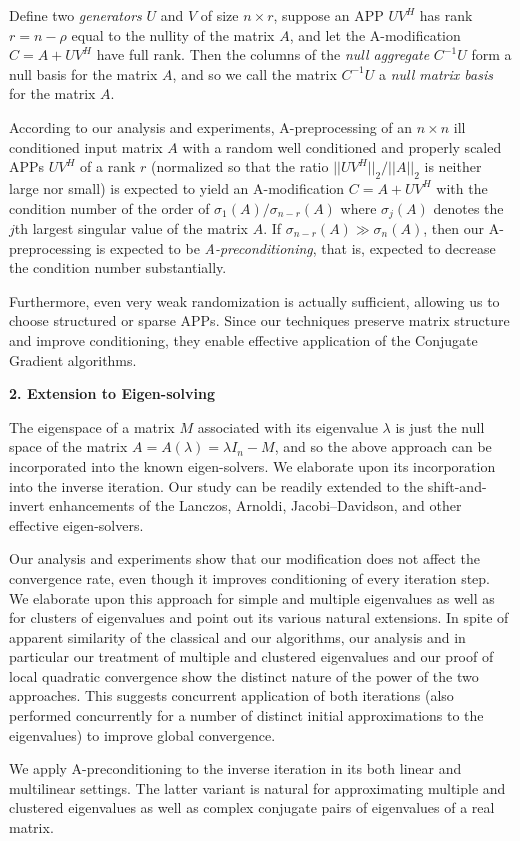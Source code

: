 \documentclass{report}
\begin{document}
Define two {\em generators} $U$ and $V$ of size $n \times r$, suppose an
APP $UV^H$ has rank $r=n-\rho$ equal to the nullity of the matrix $A$,
and let the A-modification $C=A+UV^H$ have full rank. Then the columns of
the {\em null aggregate} $C^{-1}U$ form a null basis for the matrix $A$,
and so we call the matrix $C^{-1}U$ a {\em null matrix basis} for the
matrix $A$.

According to our analysis and experiments, A-preprocessing of an $n\times
n$ ill conditioned input matrix $A$ with a random well conditioned and
properly scaled APPs $UV^H$ of a rank $r$ (normalized so that the ratio
$||UV^H||_2/||A||_2$ is neither large nor small) is expected to yield an
A-modification $C=A+UV^H$ with the condition number of the order of
$\sigma_{1}(A)/\sigma_{n-r}(A)$ where $\sigma_j(A)$ denotes the $j$th
largest singular value of the matrix $A$. If $\sigma_{n-r}(A)\gg
\sigma_{n}(A)$, then our A-preprocessing is expected to be {\em
A-preconditioning}, that is, expected to decrease the condition number
substantially.

Furthermore, even very weak randomization is actually sufficient,
allowing us to choose structured or sparse APPs. Since our techniques
preserve matrix structure and improve conditioning, they enable effective
application of the Conjugate Gradient algorithms.

\noindent
{\bf 2. Extension to Eigen-solving}

The eigenspace of a matrix $M$ associated with its eigenvalue $\lambda$
is just the null space of the matrix $A=A(\lambda)=\lambda I_n-M$, and so
the above approach can be incorporated into the known eigen-solvers. We
elaborate upon its incorporation into the inverse iteration. Our study
can be readily extended to the shift-\-and-\-invert enhancements of the
Lanczos, Arnoldi, Jacobi--Davidson, and other effective eigen-solvers.

Our analysis and experiments show that our modification does not affect
the convergence rate, even though it improves conditioning of every
iteration step. We elaborate upon this approach for simple and multiple
eigenvalues as well as for clusters of eigenvalues and point out its
various natural extensions. In spite of apparent similarity of the
classical and our algorithms, our analysis and in particular our
treatment of multiple and clustered eigenvalues and our proof of local
quadratic convergence show the distinct nature of the power of the two
approaches. This suggests concurrent application of both iterations (also
performed concurrently for a number of distinct initial approximations to
the eigenvalues) to improve global convergence.

We apply A-preconditioning to the inverse iteration in its both linear
and multilinear settings. The latter variant is natural for approximating
multiple and clustered eigenvalues as well as complex conjugate pairs of
eigenvalues of a real matrix.
\end{document}

